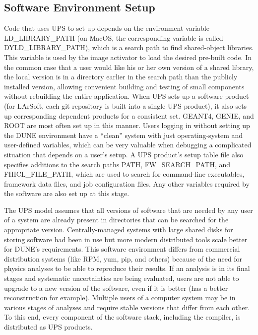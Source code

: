 \subsection{Software Environment Setup}

Code that uses UPS to set up depends on the environment variable LD\_LIBRARY\_PATH (on MacOS, the corresponding
variable is called DYLD\_LIBRARY\_PATH), which is a search path to find shared-object libraries.  This
variable is used by the image activator to load the desired pre-built code.  In the common case that a user
would like his or her own version of a shared library, the local version is in a directory earlier in the
search path than the publicly installed version, allowing convenient building and testing of small components
without rebuilding the entire application.  When UPS sets up a software product (for LArSoft, each git repository
is built into a single UPS product), it also sets up corresponding dependent products for a consistent set.
GEANT4, GENIE, and ROOT are most often set up in this manner.  Users logging in without setting up the DUNE
environment have a ``clean'' system with just operating-system and user-defined variables, which can be very
valuable when debugging a complicated situation that depends on a user's setup.
A UPS product's setup table file also specifies additions to the search paths PATH, FW\_SEARCH\_PATH, and FHICL\_FILE\_PATH,
which are used to search for command-line executables, framework data files, and job configuration files.  Any
other variables required by the software are also set up at this stage.

The UPS model assumes that all versions of software that are needed by any user of a system are already present
in directories that can be searched for the appropriate version.  Centrally-managed systems with large
shared disks for storing software had been in use but more modern distributed tools scale better for DUNE's
requirements.  This software environment differs from commercial distribution systems (like RPM, yum, pip,
and others) because of the need for physics analyses to be able to reproduce their results.  If an analysis is
in its final stages and systematic uncertainties are being evaluated, users are not able to upgrade to a new
version of the software, even if it is better (has a better reconstruction for example).  Multiple users of a computer
system may be in various stages of analyses and require stable versions that differ from each other.  To this end,
every component of the software stack, including the compiler, is distributed as UPS products.

